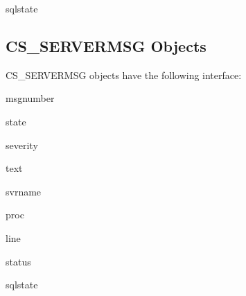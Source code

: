 \begin{memberdesc}[CS_CLIENTMSG]{sqlstate}
\end{memberdesc}

\subsection{CS_SERVERMSG Objects}

CS_SERVERMSG objects have the following interface:

\begin{memberdesc}[CS_SERVERMSG]{msgnumber}
\end{memberdesc}

\begin{memberdesc}[CS_SERVERMSG]{state}
\end{memberdesc}

\begin{memberdesc}[CS_SERVERMSG]{severity}
\end{memberdesc}

\begin{memberdesc}[CS_SERVERMSG]{text}
\end{memberdesc}

\begin{memberdesc}[CS_SERVERMSG]{svrname}
\end{memberdesc}

\begin{memberdesc}[CS_SERVERMSG]{proc}
\end{memberdesc}

\begin{memberdesc}[CS_SERVERMSG]{line}
\end{memberdesc}

\begin{memberdesc}[CS_SERVERMSG]{status}
\end{memberdesc}

\begin{memberdesc}[CS_SERVERMSG]{sqlstate}
\end{memberdesc}

